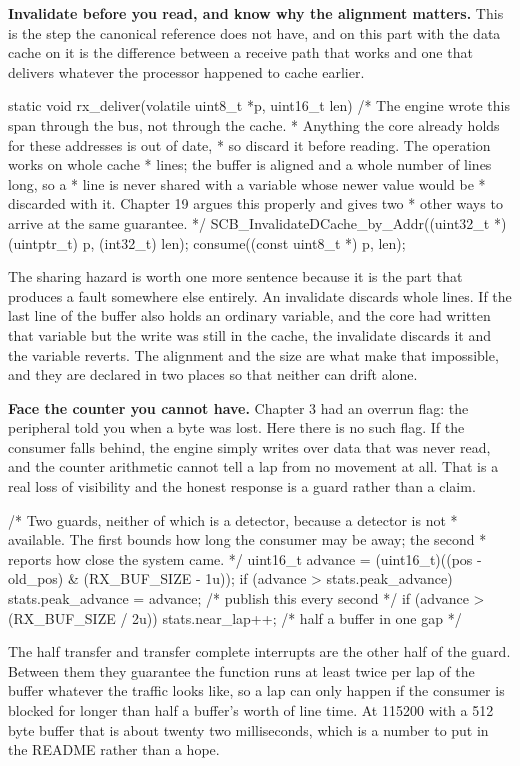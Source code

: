 \begin{steps}
\item \textbf{Invalidate before you read, and know why the alignment matters.}
This is the step the canonical reference does not have, and on this part with
the data cache on it is the difference between a receive path that works and one
that delivers whatever the processor happened to cache earlier.
\begin{ccode}
static void rx_deliver(volatile uint8_t *p, uint16_t len)
{
    /* The engine wrote this span through the bus, not through the cache.
     * Anything the core already holds for these addresses is out of date,
     * so discard it before reading. The operation works on whole cache
     * lines; the buffer is aligned and a whole number of lines long, so a
     * line is never shared with a variable whose newer value would be
     * discarded with it. Chapter 19 argues this properly and gives two
     * other ways to arrive at the same guarantee. */
    SCB_InvalidateDCache_by_Addr((uint32_t *)(uintptr_t) p, (int32_t) len);
    consume((const uint8_t *) p, len);
}
\end{ccode}
The sharing hazard is worth one more sentence because it is the part that
produces a fault somewhere else entirely. An invalidate discards whole lines. If
the last line of the buffer also holds an ordinary variable, and the core had
written that variable but the write was still in the cache, the invalidate
discards it and the variable reverts. The alignment and the size are what make
that impossible, and they are declared in two places so that neither can drift
alone.

\item \textbf{Face the counter you cannot have.} Chapter 3 had an overrun flag:
the peripheral told you when a byte was lost. Here there is no such flag. If the
consumer falls behind, the engine simply writes over data that was never read,
and the counter arithmetic cannot tell a lap from no movement at all. That is a
real loss of visibility and the honest response is a guard rather than a claim.
\begin{ccode}
/* Two guards, neither of which is a detector, because a detector is not
 * available. The first bounds how long the consumer may be away; the second
 * reports how close the system came. */
uint16_t advance = (uint16_t)((pos - old_pos) & (RX_BUF_SIZE - 1u));
if (advance > stats.peak_advance)
    stats.peak_advance = advance;              /* publish this every second */
if (advance > (RX_BUF_SIZE / 2u))
    stats.near_lap++;                          /* half a buffer in one gap  */
\end{ccode}
The half transfer and transfer complete interrupts are the other half of the
guard. Between them they guarantee the function runs at least twice per lap of
the buffer whatever the traffic looks like, so a lap can only happen if the
consumer is blocked for longer than half a buffer's worth of line time. At
115200 with a 512 byte buffer that is about twenty two milliseconds, which is a
number to put in the README rather than a hope.


\end{steps}
